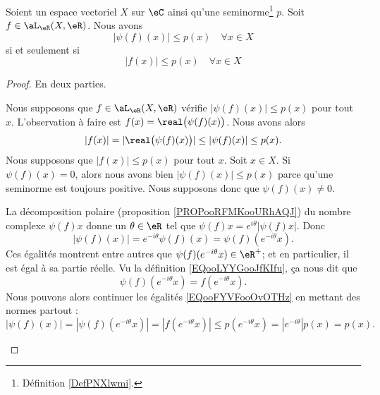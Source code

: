 \begin{lemma}     \label{LEMooUFMFooEXecXE}
	Soient un espace vectoriel \( X\) sur \( \eC\) ainsi qu'une seminorme\footnote{Définition \ref{DefPNXlwmi}.} \( p\). Soit \( f\in\aL_{\eR}(X,\eR)\). Nous avons
	\begin{equation}
		| \psi(f)(x) |\leq p(x)\quad\forall x\in X
	\end{equation}
	si et seulement si
	\begin{equation}
		| f(x) |\leq p(x)\quad\forall x\in X
	\end{equation}
\end{lemma}

\begin{proof}
	En deux parties.
	\begin{subproof}
		\spitem[\( \Rightarrow\)]
		Nous supposons que \( f\in \aL_{\eR}(X,\eR)\) vérifie \( | \psi(f)(x) |\leq p(x)\) pour tout \( x\). L'observation à faire est \( f(x)=\real\big( \psi(f)(x) \big)\). Nous avons alors
		\begin{equation}
			| f(x) |=| \real\big( \psi(f)(x) \big) |\leq | \psi(f)(x) |\leq p(x).
		\end{equation}
		\spitem[\( \Leftarrow\)]
		Nous supposons que \( | f(x) |\leq p(x)\) pour tout \( x\). Soit \( x\in X\). Si \( \psi(f)(x)=0\), alors nous avons bien \( | \psi(f)(x) |\leq p(x)\) parce qu'une seminorme est toujours positive. Nous supposons donc que \( \psi(f)(x)\neq 0\).

		La décomposition polaire (proposition \ref{PROPooRFMKooURhAQJ}) du nombre complexe \( \psi(f)x\) donne un \( \theta\in \eR\) tel que \( \psi(f)x= e^{i\theta}| \psi(f)x |\). Donc
		\begin{equation}        \label{EQooFYVFooOvOTHz}
			| \psi(f)(x) |= e^{-i\theta}\psi(f)(x)=\psi(f)( e^{-i\theta}x).
		\end{equation}
		Ces égalités montrent entre autres que \( \psi(f)( e^{-i\theta}x)\in \eR^+\); et en particulier, il est égal à sa partie réelle. Vu la définition \eqref{EQooLYYGooJfKIfu}, ça nous dit que
		\begin{equation}
			\psi(f)( e^{-i\theta}x)=f( e^{-i\theta}x).
		\end{equation}
		Nous pouvons alors continuer les égalités \eqref{EQooFYVFooOvOTHz} en mettant des normes partout :
		\begin{equation}
			| \psi(f)(x) |=| \psi(f)( e^{-i\theta}x) |=| f( e^{-i\theta}x) |\leq p( e^{-i\theta}x)=|  e^{-i\theta} |p(x)=p(x).
		\end{equation}
	\end{subproof}
\end{proof}

